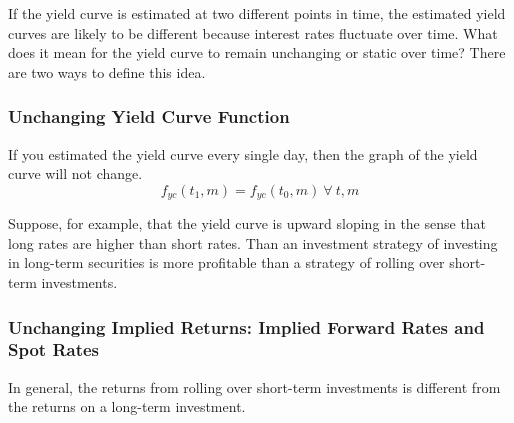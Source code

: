 \documentclass[12pt]{scrartcl}
\begin{document}
{If the yield curve is estimated at two different points in time, the estimated yield curves are likely to be different because interest rates fluctuate over time. What does it mean for the yield curve to remain unchanging or static over time? There are two ways to define this idea.

\subsubsection{Unchanging Yield Curve Function}

If you estimated the yield curve every single day, then the graph of the yield curve will not change.
\[f_{yc}(t_1, m) = f_{yc}(t_0, m) \ \forall \ t, m\]
\begin{note}
    Suppose, for example, that the yield curve is upward sloping in the sense that long rates are higher than short rates. Than an investment strategy of investing in long-term securities is more profitable than a strategy of rolling over short-term investments.
\end{note}

\subsubsection{Unchanging Implied Returns: Implied Forward Rates and Spot Rates}

In general, the returns from rolling over short-term investments is different from the returns on a long-term investment.

}
\end{document}
